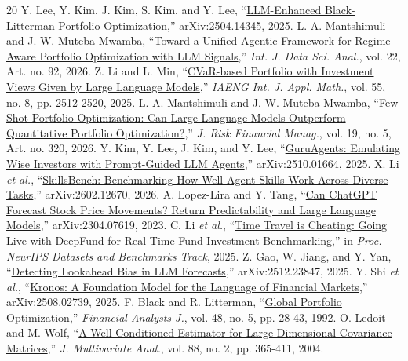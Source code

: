 \documentclass[conference]{IEEEtran}
\begin{document}
\begin{thebibliography}{20}
 Y. Lee, Y. Kim, J. Kim, S. Kim, and Y. Lee, ``\href{https://arxiv.org/abs/2504.14345}{LLM-Enhanced Black-Litterman Portfolio Optimization},'' arXiv:2504.14345, 2025.
 L. A. Mantshimuli and J. W. Muteba Mwamba, ``\href{https://link.springer.com/article/10.1007/s41060-026-01066-0}{Toward a Unified Agentic Framework for Regime-Aware Portfolio Optimization with LLM Signals},'' \textit{Int. J. Data Sci. Anal.}, vol. 22, Art. no. 92, 2026.
 Z. Li and L. Min, ``\href{https://www.iaeng.org/IJAM/issues_v55/issue_8/IJAM_55_8_21.pdf}{CVaR-based Portfolio with Investment Views Given by Large Language Models},'' \textit{IAENG Int. J. Appl. Math.}, vol. 55, no. 8, pp. 2512-2520, 2025.
 L. A. Mantshimuli and J. W. Muteba Mwamba, ``\href{https://www.mdpi.com/1911-8074/19/5/320}{Few-Shot Portfolio Optimization: Can Large Language Models Outperform Quantitative Portfolio Optimization?},'' \textit{J. Risk Financial Manag.}, vol. 19, no. 5, Art. no. 320, 2026.
 Y. Kim, Y. Lee, J. Kim, and Y. Lee, ``\href{https://arxiv.org/abs/2510.01664}{GuruAgents: Emulating Wise Investors with Prompt-Guided LLM Agents},'' arXiv:2510.01664, 2025.
 X. Li \textit{et al.}, ``\href{https://arxiv.org/abs/2602.12670}{SkillsBench: Benchmarking How Well Agent Skills Work Across Diverse Tasks},'' arXiv:2602.12670, 2026.
 A. Lopez-Lira and Y. Tang, ``\href{https://arxiv.org/abs/2304.07619}{Can ChatGPT Forecast Stock Price Movements? Return Predictability and Large Language Models},'' arXiv:2304.07619, 2023.
 C. Li \textit{et al.}, ``\href{https://arxiv.org/abs/2505.11065}{Time Travel is Cheating: Going Live with DeepFund for Real-Time Fund Investment Benchmarking},'' in \textit{Proc. NeurIPS Datasets and Benchmarks Track}, 2025.
 Z. Gao, W. Jiang, and Y. Yan, ``\href{https://arxiv.org/abs/2512.23847}{Detecting Lookahead Bias in LLM Forecasts},'' arXiv:2512.23847, 2025.
 Y. Shi \textit{et al.}, ``\href{https://arxiv.org/abs/2508.02739}{Kronos: A Foundation Model for the Language of Financial Markets},'' arXiv:2508.02739, 2025.
 F. Black and R. Litterman, ``\href{https://people.duke.edu/~charvey/Teaching/BA453_2006/Black_Litterman_Global_Portfolio_Optimization_1992.pdf}{Global Portfolio Optimization},'' \textit{Financial Analysts J.}, vol. 48, no. 5, pp. 28-43, 1992.
 O. Ledoit and M. Wolf, ``\href{https://econpapers.repec.org/RePEc:eee:jmvana:v:88:y:2004:i:2:p:365-411}{A Well-Conditioned Estimator for Large-Dimensional Covariance Matrices},'' \textit{J. Multivariate Anal.}, vol. 88, no. 2, pp. 365-411, 2004.

\end{thebibliography}
\end{document}
